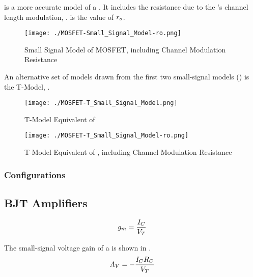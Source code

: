  is a more accurate model of a .
It includes the resistance due to the 's channel length modulation, .
 is the value of $r_{o}$.

\begin{figure}[h!tbp]
  \centering
  \texttt{[image: ./MOSFET-Small\_Signal\_Model-ro.png]}
  \caption{Small Signal Model of MOSFET, including Channel Modulation Resistance \parencite[p.~387]{sedraTextbook7}}
  \label{fig:MOSFET-Small_Signal_Model-ro}
\end{figure}

An alternative set of models drawn from the first two small-signal models () is the T-Model, .

\begin{figure}[h!tbp]
  \centering
  \texttt{[image: ./MOSFET-T\_Small\_Signal\_Model.png]}
  \caption{T-Model Equivalent of  \parencite[p.~394]{sedraTextbook7}}
  \label{fig:MOSFET-T_Small_Signal_Model}
\end{figure}

\begin{figure}[h!tbp]
  \centering
  \texttt{[image: ./MOSFET-T\_Small\_Signal\_Model-ro.png]}
  \caption{T-Model Equivalent of , including Channel Modulation Resistance \parencite[p.~395]{sedraTextbook7}}
  \label{fig:MOSFET-T_Small_Signal_Model-ro}
\end{figure}


\subsubsection{Configurations}\label{subsubsec:MOSFET_Configurations}

\subsection{BJT Amplifiers}\label{subsec:BJT_Amps}
\begin{equation}\label{eq:BJT-Transconductance_Gain}
  \TransconductanceGain = \frac{\DCCurrent{\Collector}}{\ThermalVoltage}
\end{equation}

The small-signal voltage gain of a  is shown in .
\begin{equation}\label{eq:BJT-Small_Signal_Voltage_Gain}
  \Amp{V} = - \frac{\DCCurrent{\Collector} R_{\Collector}}{\ThermalVoltage}
\end{equation}

